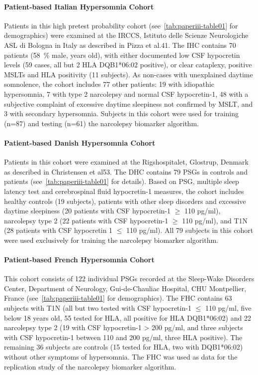 \paragraph{Patient-based Italian Hypersomnia Cohort}
Patients in this high pretest probability cohort (see~\cref{tab:paperiii-table01} for demographics) were examined at the IRCCS, Istituto delle Scienze Neurologiche ASL di Bologna in Italy as described in Pizza et al.41.
The IHC contains 70 \ntI patients (\SI{58}{\percent} male,  years old), with either documented low CSF hypocretin levels (59 cases, all but 2 HLA DQB1*06:02 positive), or clear cataplexy, positive MSLTs and HLA positivity (11 subjects).
As non-\ntI cases with unexplained daytime somnolence, the cohort includes 77 other patients: 19 with idiopathic hypersomnia, 7 with type 2 narcolepsy and normal CSF hypocretin-1, 48 with a subjective complaint of excessive daytime sleepiness not confirmed by MSLT, and 3 with secondary hypersomnia.
Subjects in this cohort were used for training (n=87) and testing (n=61) the narcolepsy biomarker algorithm. 

\paragraph{Patient-based Danish Hypersomnia Cohort}
Patients in this cohort were examined at the Rigshospitalet, Glostrup, Denmark as described in Christensen et al53.
The DHC contains 79 PSGs in controls and patients (see~\cref{tab:paperiii-table01} for details).
Based on PSG, multiple sleep latency test and cerebrospinal fluid hypocretin-1 measures, the cohort includes healthy controls (19 subjects), patients with other sleep disorders and excessive daytime sleepiness (20 patients with CSF hypocretin-1 $\geq$ 110 pg/ml), narcolepsy type 2 (22 patients with CSF hypocretin-1 $\geq$ 110 pg/ml), and T1N (28 patients with CSF hypocretin 1 $\leq$ 110 pg/ml).
All 79 subjects in this cohort were used exclusively for training the narcolepsy biomarker algorithm.

\paragraph{Patient-based French Hypersomnia Cohort}
This cohort consists of 122 individual PSGs recorded at the Sleep-Wake Disorders Center, Department of Neurology, Gui-de-Chauliac Hospital, CHU Montpellier, France (see~\cref{tab:paperiii-table01} for demographics).
The FHC contains 63 subjects with T1N (all but two tested with CSF hypocretin-1 $\leq$ 110 pg/ml, five below 18 years old, 55 tested for HLA, all positive for HLA DQB1*06:02) and 22 narcolepsy type 2 (19 with CSF hypocretin-1 > 200 pg/ml, and three subjects with CSF hypocretin-1 between 110 and 200 pg/ml, three HLA positive).
The remaining 36 subjects are controls (15 tested for HLA, two with DQB1*06:02) without other symptoms of hypersomnia.
The FHC was used as data for the replication study of the narcolepsy biomarker algorithm.

